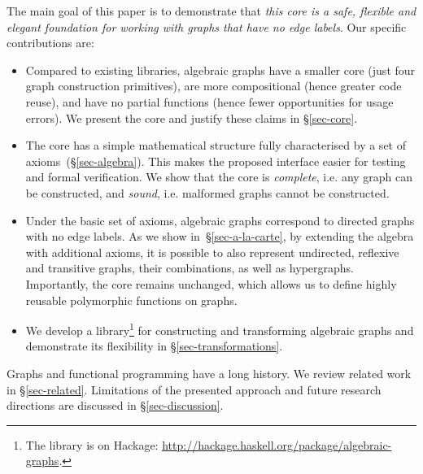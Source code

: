 The main goal of this paper is to demonstrate that \emph{this core is a safe, flexible
and elegant foundation for working with graphs that have no edge labels}. Our specific
contributions are:
\vspace{-0.25mm}
\begin{itemize}
  \item Compared to existing libraries, algebraic graphs have a smaller
  core (just four graph construction primitives), are more compositional
  (hence greater code reuse), and have no partial functions (hence fewer
  opportunities for usage errors). We present the core and justify these claims
  in \S\ref{sec-core}.

  \item The core has a simple mathematical structure fully characterised
  by a set of axioms~(\S\ref{sec-algebra}). This makes the
  proposed interface easier for testing and formal verification. We show that
  the core is \emph{complete}, i.e. any graph can be constructed, and \emph{sound},
  i.e. malformed graphs cannot be constructed.

  \item Under the basic set of axioms, algebraic graphs correspond to directed
  graphs with no edge labels. As we show in~\S\ref{sec-a-la-carte}, by extending
  the algebra   with additional axioms, it is possible to also represent undirected,
  reflexive and transitive graphs, their combinations, as well as hypergraphs.
  Importantly, the core remains unchanged, which allows us to define highly
  reusable polymorphic functions on graphs.

  \item We develop a library\footnote{The library is on Hackage:
  \url{http://hackage.haskell.org/package/algebraic-graphs}.}
  for constructing and transforming algebraic graphs and demonstrate its
  flexibility in \S\ref{sec-transformations}.
\end{itemize}
\vspace{-0.25mm}

Graphs and functional programming have a long history. We review related
work in \S\ref{sec-related}. Limitations of the presented approach and future
research directions are discussed in \S\ref{sec-discussion}.
